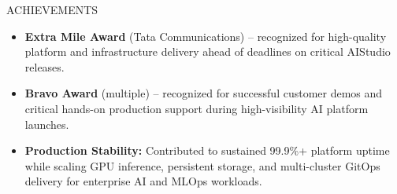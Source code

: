 \documentclass{resume}
\begin{document}

\begin{rSection}{ACHIEVEMENTS}

\begin{itemize}
\itemsep -3pt
\parsep 0pt
\partopsep 0pt
\topsep 2pt

\item \textbf{Extra Mile Award} (Tata Communications) -- recognized for high-quality platform and infrastructure delivery ahead of deadlines on critical AIStudio releases.

\item \textbf{Bravo Award} (multiple) -- recognized for successful customer demos and critical hands-on production support during high-visibility AI platform launches.

\item \textbf{Production Stability:} Contributed to sustained 99.9\%+ platform uptime while scaling GPU inference, persistent storage, and multi-cluster GitOps delivery for enterprise AI and MLOps workloads.

\end{itemize}

\end{rSection}
\end{document}
